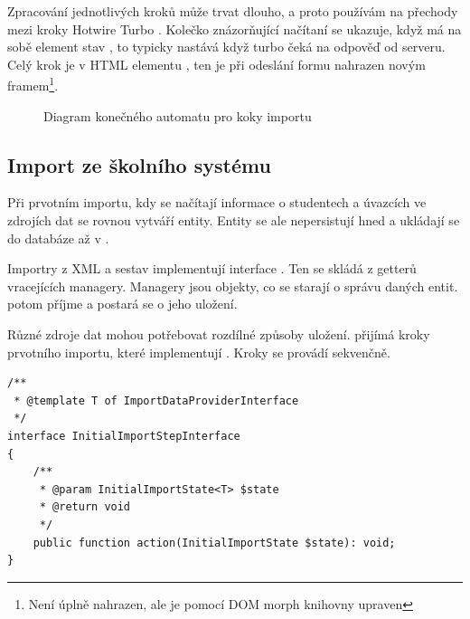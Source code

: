 Zpracování jednotlivých kroků může trvat dlouho, a proto používám na přechody mezi kroky Hotwire Turbo .
Kolečko znázorňující načítaní se ukazuje, když má na sobě element  stav , to typicky nastává když turbo čeká na odpověď od serveru.
Celý krok je v HTML elementu , ten je při odeslání formu nahrazen novým framem\footnote{Není úplně nahrazen, ale je pomocí DOM morph knihovny upraven}.


\clearpage

\begin{figure}
	\centering
\resizebox{!}{0.95\textheight}{\huge{}}
  \caption{Diagram konečného automatu pro koky importu}
  \label{postup:import-diagram}
\end{figure}


\clearpage



\subsection{Import ze školního systému}
Při prvotním importu, kdy se načítají informace o studentech a úvazcích ve zdrojích dat se rovnou vytváří entity.
Entity se ale nepersistují hned a ukládají se do databáze až v .

Importry z XML a sestav implementují interface . Ten se skládá z getterů vracejících managery.
Managery jsou objekty, co se starají o správu daných entit.
 potom příjme  a postará se o jeho uložení. 

Různé zdroje dat mohou potřebovat rozdílné způsoby uložení.
 přijímá kroky prvotního importu, které implementují .
Kroky se provádí sekvenčně.

\begin{code}[H]

  \begin{verbatim}
/**
 * @template T of ImportDataProviderInterface
 */
interface InitialImportStepInterface
{
    /**
     * @param InitialImportState<T> $state
     * @return void
     */
    public function action(InitialImportState $state): void;
}
   \end{verbatim}
  \caption{Zdrojový kód }

\end{code}


